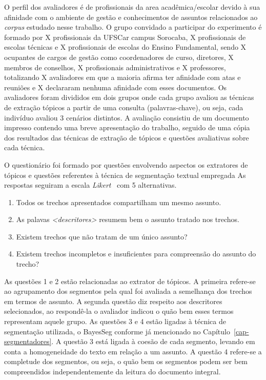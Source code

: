 O perfil dos avaliadores é de profissionais da area acadêmica/escolar devido à sua afinidade com o ambiente de gestão e conhecimentos de assuntos relacionados ao \textit{corpus} estudado nesse trabalho. O grupo convidado a participar do experimento é formado por X profissionais da UFSCar campus Sorocaba, X profissionais de escolas técnicas e X profissionais de escolas do Ensino Fundamental, sendo X ocupantes de cargos de gestão como coordenadores de curso, diretores, X membros de conselhos, X profissionais administrativos e X professores, totalizando X avaliadores em que a maioria afirma ter afinidade com atas e reuniões e X declararam nenhuma afinidade com esses documentos. Os avaliadores foram divididos em dois grupos onde cada grupo avaliou as técnicas de extração tópicos a partir de uma consulta (palavras-chave), ou seja, cada indivíduo avaliou 3 cenários distintos. A avaliação consistiu de um documento impresso contendo uma breve apresentação do trabalho, seguido de uma cópia dos resultados das técnicas de extração de tópicos e questões avaliativas sobre cada técnica.


O questionário foi formado por questões envolvendo aspectos os extratores de tópicos e questões referentes à técnica de segmentação textual empregada
As respostas seguiram a escala \textit{Likert}~\cite{Norman2010} com 5 alternativas. 

\begin{enumerate}
	\item Todos os trechos apresentados compartilham um mesmo assunto.
	\item As palavas \textit{<descritores>} resumem bem o assunto tratado nos trechos.
	\item Existem trechos que não tratam de um único assunto?
	\item Existem trechos incompletos e insuficientes para compreensão do assunto do trecho?
\end{enumerate}


As questões 1 e 2 estão relacionadas ao extrator de tópicos. A primeira refere-se ao agrupamento dos segmentos pela qual foi avaliada a semelhança dos trechos em termos de assunto. A segunda questão diz respeito aos descritores selecionados, ao respondê-la o avaliador indicou o quão bem esses termos representam aquele grupo.
As questões 3 e 4 estão ligadas à técnica de segmentação utilizada, o BayesSeg conforme já mencionado no Capítulo~\ref{cap-segmentadores}. A questão 3 está ligada à coesão de cada segmento, levando em conta a homogeneidade do texto em relação a um assunto. A questão 4 refere-se a completude dos segmentos, ou seja, o quão bem os segmentos podem ser bem compreendidos independentemente da leitura do documento integral.



